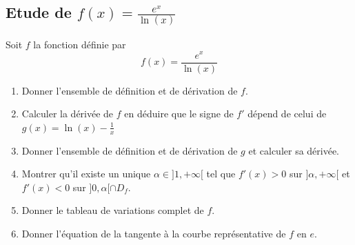 \subsection{Etude de $f(x)= \frac{e^{x}}{\ln(x)} $}
\begin{exercice}
Soit $f$ la fonction définie par 
$$f(x)= \frac{e^{x}}{\ln(x)} $$
\begin{enumerate}
\item Donner l'ensemble de définition et de dérivation de $f$. 
\item Calculer la dérivée de $f$ en déduire que le signe de $f'$ dépend de celui de $g(x)=\ln(x) - \frac{1}{x}$
\item Donner l'ensemble de définition et de dérivation de $g$ et calculer sa dérivée. 
\item Montrer qu'il existe un unique $\alpha\in ]1,+\infty[$ tel que $f'(x)>0$ sur $]\alpha, +\infty[$ et $f'(x)<0$ sur $]0,\alpha[\cap D_f$. 
\item Donner le tableau de variations complet de $f$. 
\item Donner l'équation de la tangente à la courbe représentative de $f$ en $e$.

\end{enumerate}
\end{exercice}

